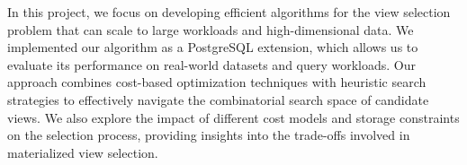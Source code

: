 In this project, we focus on developing efficient algorithms for the view selection problem that can scale to large workloads and high-dimensional data. We implemented our algorithm as a PostgreSQL extension, which allows us to evaluate its performance on real-world datasets and query workloads. Our approach combines cost-based optimization techniques with heuristic search strategies to effectively navigate the combinatorial search space of candidate views. We also explore the impact of different cost models and storage constraints on the selection process, providing insights into the trade-offs involved in materialized view selection.